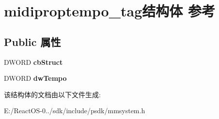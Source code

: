 \hypertarget{structmidiproptempo__tag}{}\section{midiproptempo\+\_\+tag结构体 参考}
\label{structmidiproptempo__tag}
\subsection*{Public 属性}
\begin{DoxyCompactItemize}
\item 
\mbox{\label{structmidiproptempo__tag_adaa3cf3114af230cfbf1518fb4a956ca}} 
D\+W\+O\+RD {\bfseries cb\+Struct}
\item 
\mbox{\label{structmidiproptempo__tag_ac38ad456e15c9f30f99be8fbc3a01944}} 
D\+W\+O\+RD {\bfseries dw\+Tempo}
\end{DoxyCompactItemize}


该结构体的文档由以下文件生成\+:\begin{DoxyCompactItemize}
\item 
E\+:/\+React\+O\+S-\/0../sdk/include/psdk/mmsystem.\+h\end{DoxyCompactItemize}
